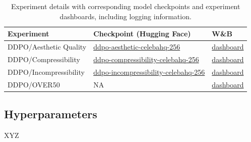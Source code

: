 \begin{appendixs}
    \begin{table}[h!]
        \centering
        \begin{tabular}{l l l}
            \toprule
            \textbf{Experiment} & \textbf{Checkpoint (Hugging Face)} & \textbf{W\&B} \\
            \midrule
            DDPO/Aesthetic Quality & \href{https://huggingface.co/alkzar90/ddpo-aesthetic-celebahq-256}{ddpo-aesthetic-celebahq-256}  & \href{https://wandb.ai/alcazar90/ddpo-aesthetic-ddpm-celebahq256}{dashboard} \\
            DDPO/Compressibility & \href{https://huggingface.co/alkzar90/ddpo-compressibility-celebahq-256}{ddpo-compressibility-celebahq-256} & \href{https://wandb.ai/alcazar90/ddpo-compressibility-ddpm-celebahq256}{dashboard} \\
            DDPO/Incompressibility  & \href{https://huggingface.co/alkzar90/ddpo-incompressibility-celebahq-256}{ddpo-incompressibility-celebahq-256} & \href{https://wandb.ai/alcazar90/ddpo-incompressibility-ddpm-celebahq256}{dashboard} \\
            DDPO/OVER50 & NA & \href{https://wandb.ai/alcazar90/ddpo-over50-ddpm-celebahq256}{dashboard} \\
            \bottomrule
        \end{tabular}
        \caption{Experiment details with corresponding model checkpoints and experiment dashboards, including logging information.}
        \label{tab:experiment_details}
    \end{table}


    \subsection{Hyperparameters}

    XYZ


\end{appendixs}

